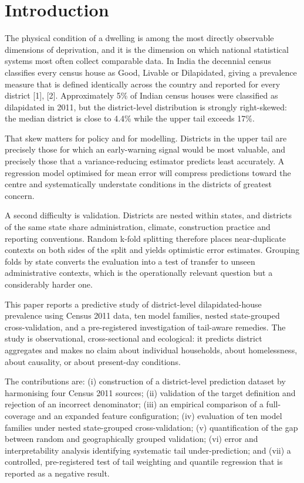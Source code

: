 \documentclass[conference]{IEEEtran}
\begin{document}
\section{Introduction}

The physical condition of a dwelling is among the most directly observable dimensions of deprivation, and it is the dimension on which national statistical systems most often collect comparable data. In India the decennial census classifies every census house as Good, Livable or Dilapidated, giving a prevalence measure that is defined identically across the country and reported for every district [1], [2]. Approximately 5\% of Indian census houses were classified as dilapidated in 2011, but the district-level distribution is strongly right-skewed: the median district is close to 4.4\% while the upper tail exceeds 17\%.

That skew matters for policy and for modelling. Districts in the upper tail are precisely those for which an early-warning signal would be most valuable, and precisely those that a variance-reducing estimator predicts least accurately. A regression model optimised for mean error will compress predictions toward the centre and systematically understate conditions in the districts of greatest concern.

A second difficulty is validation. Districts are nested within states, and districts of the same state share administration, climate, construction practice and reporting conventions. Random k-fold splitting therefore places near-duplicate contexts on both sides of the split and yields optimistic error estimates. Grouping folds by state converts the evaluation into a test of transfer to unseen administrative contexts, which is the operationally relevant question but a considerably harder one.

This paper reports a predictive study of district-level dilapidated-house prevalence using Census 2011 data, ten model families, nested state-grouped cross-validation, and a pre-registered investigation of tail-aware remedies. The study is observational, cross-sectional and ecological: it predicts district aggregates and makes no claim about individual households, about homelessness, about causality, or about present-day conditions.

The contributions are: (i) construction of a district-level prediction dataset by harmonising four Census 2011 sources; (ii) validation of the target definition and rejection of an incorrect denominator; (iii) an empirical comparison of a full-coverage and an expanded feature configuration; (iv) evaluation of ten model families under nested state-grouped cross-validation; (v) quantification of the gap between random and geographically grouped validation; (vi) error and interpretability analysis identifying systematic tail under-prediction; and (vii) a controlled, pre-registered test of tail weighting and quantile regression that is reported as a negative result.
\end{document}
